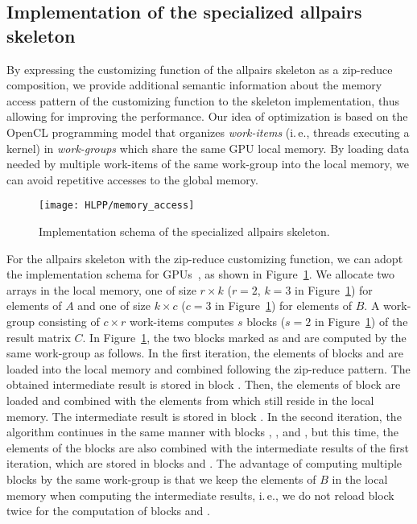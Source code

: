 \subsection{Implementation of the specialized allpairs skeleton}
By expressing the customizing function of the allpairs skeleton as a zip-reduce composition, we provide additional semantic information about the memory access pattern of the customizing function to the skeleton implementation, thus allowing for improving the performance.
Our idea of optimization is based on the OpenCL programming model that organizes \emph{work-items} (i.\,e., threads executing a kernel) in \emph{work-groups} which share the same GPU local memory.
By loading data needed by multiple work-items of the same work-group into the local memory, we can avoid repetitive accesses to the global memory.

\begin{figure}[b]
  \centering
  \texttt{[image: HLPP/memory\_access]}
  \caption{Implementation schema of the specialized allpairs skeleton.}
  \label{fig:memory_access}
\end{figure}
For the allpairs skeleton with the zip-reduce customizing function, we can adopt the implementation schema for GPUs~\cite{SaA-13}, as shown in Figure~\ref{fig:memory_access}.
We allocate two arrays in the local memory, one of size $r\times k$ ($r=2$, $k=3$ in Figure~\ref{fig:memory_access}) for elements of $A$ and one of size $k\times c$ ($c=3$ in Figure~\ref{fig:memory_access}) for elements of $B$.
A work-group consisting of $c\times r$ work-items computes $s$ blocks ($s=2$ in Figure~\ref{fig:memory_access}) of the result matrix $C$.
In Figure~\ref{fig:memory_access}, the two blocks marked as  and  are computed by the same work-group as follows.
In the first iteration, the elements of blocks  and  are loaded into the local memory and combined following the zip-reduce pattern.
The obtained intermediate result is stored in block .
Then, the elements of block  are loaded and combined with the elements from  which still reside in the local memory.
The intermediate result is stored in block .
In the second iteration, the algorithm continues in the same manner with blocks , , and , but this time, the elements of the blocks are also combined with the intermediate results of the first iteration, which are stored in blocks  and .
The advantage of computing multiple blocks by the same work-group is that we keep the elements of $B$ in the local memory when computing the intermediate results, i.\,e., we do not reload block  twice for the computation of blocks  and .

